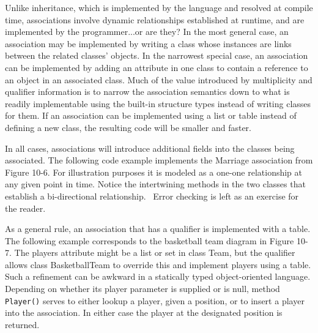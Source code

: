 Unlike inheritance, which is implemented by the language and resolved at
compile time, associations involve dynamic
relationships established at runtime, and are implemented by the
programmer...or are they? In the most general case, an association may
be implemented by writing a class whose instances are links between the
related classes' objects. In the narrowest special
case, an association can be implemented by adding an attribute in one
class to contain a reference to an object in an
associated class. Much of the value introduced by multiplicity and
qualifier information is to narrow the association semantics down to
what is readily implementable using the built-in structure types
instead of writing classes for them. If an association can be
implemented using a list or table instead of defining a new class, the
resulting code will be smaller and faster.

In all cases, associations will introduce additional fields into the
classes being associated. The following code example implements the
Marriage association from Figure 10-6. For illustration purposes it is
modeled as a one-one relationship at any given point in time. Notice
the intertwining methods in the two classes that establish a
bi-directional relationship. \ Error checking is left as an exercise
for the reader.


As a general rule, an association that has a qualifier is implemented
with a table. The following example corresponds to
the basketball team diagram in Figure 10-7. The players attribute might
be a list or set in class Team, but the qualifier allows class
BasketballTeam to override this and implement players using a table.
Such a refinement can be awkward in a statically typed object-oriented
language.
Depending on whether its player parameter is supplied or is null, method
\texttt{Player()} serves to either lookup a player, given a position,
or to insert a player into the association. In either case the player
at the designated position is returned.

